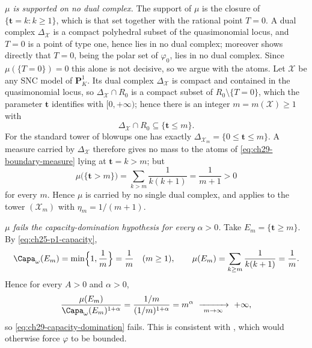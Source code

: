 \begin{example}
\emph{$\mu$ is supported on no dual complex.}  The support of $\mu$ is
the closure of $\{\mathbf t=k:k\geq1\}$, which is that set together with
the rational point $T=0$.  A dual complex $\Delta_{\mathcal X}$ is a
compact polyhedral subset of the quasimonomial locus, and $T=0$ is a point
of type one, hence lies in no dual complex; moreover
 shows directly that
$T=0$, being the polar set of $\varphi_0$, lies in no dual complex.
Since $\mu(\{T=0\})=0$ this alone is not decisive, so we argue with the
atoms.  Let $\mathcal X$ be any SNC model of $\mathbf P^1_K$.  Its dual
complex $\Delta_{\mathcal X}$ is compact and contained in the
quasimonomial locus, so
$\Delta_{\mathcal X}\cap R_0$ is a compact subset of
$R_0\setminus\{T=0\}$, which the parameter $\mathbf t$ identifies with
$[0,+\infty)$; hence there is an integer $m=m(\mathcal X)\geq1$ with
\[
 \Delta_{\mathcal X}\cap R_0\subseteq\{\mathbf t\leq m\} .
\]
For the standard tower of blowups one has exactly
$\Delta_{\mathcal X_m}=\{0\leq\mathbf t\leq m\}$.  A measure carried by
$\Delta_{\mathcal X}$ therefore gives no mass to the atoms of
\eqref{eq:ch29-boundary-measure} lying at $\mathbf t=k>m$; but
\[
 \mu\bigl(\{\mathbf t>m\}\bigr)=\sum_{k>m}\frac1{k(k+1)}
 =\frac1{m+1}>0
\]
for every $m$.  Hence $\mu$ is carried by no single dual complex, and
 applies to the tower
$(\mathcal X_m)$ with $\eta_m=1/(m+1)$.

\emph{$\mu$ fails the capacity-domination hypothesis for every
$\alpha>0$.}  Take $E_m=\{\mathbf t\geq m\}$.  By
\eqref{eq:ch25-p1-capacity},
\[
 \Capa_\omega(E_m)=\min\Bigl\{1,\frac1m\Bigr\}=\frac1m
 \quad(m\geq1),
 \qquad
 \mu(E_m)=\sum_{k\geq m}\frac1{k(k+1)}=\frac1m .
\]
Hence for every $A>0$ and $\alpha>0$,
\begin{equation}
\label{eq:ch29-borderline-ratio}
 \frac{\mu(E_m)}{\Capa_\omega(E_m)^{1+\alpha}}
 =\frac{1/m}{(1/m)^{1+\alpha}}=m^{\alpha}
 \ \xrightarrow[\ m\to\infty\ ]{}\ +\infty ,
\end{equation}
so \eqref{eq:ch29-capacity-domination} fails.  This is consistent with
, which would otherwise force $\varphi$ to
be bounded.
\end{example}

